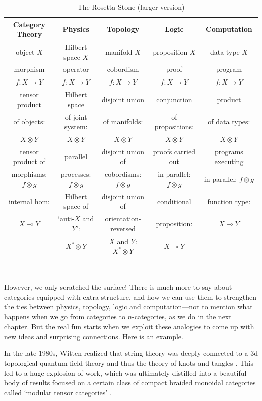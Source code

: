 \documentclass[12pt,twoside,openright]{report}
\newcommand{\maps}{\colon}
\newcommand{\lhom}{\multimap}
\newcommand{\tensor}{\otimes}
\begin{document}
\begin{table}[h]
\begin{center}
\begin{tabular}{|c|c|c|c|c|}
\hline Category Theory & Physics & Topology  & Logic & Computation 
\\
\hline object $X$       &
Hilbert space $X$  &
manifold $X$ &
proposition $X$ &
data type $X$
\\
\hline morphism &
operator &
cobordism &
proof  &
program  \\
$f\maps X \to Y$ &
$f\maps X \to Y$ &
$f \maps X \to Y$ &
$f \maps X \to Y$ &
$f \maps X \to Y$
\\
\hline tensor product  &
Hilbert space   &
disjoint union &
conjunction &
product 
\\
of objects: &
of joint system: &
of manifolds: &
of propositions: &
of data types: 
\\
$X \tensor Y$ &
$X \tensor Y$ &
$X \tensor Y$ &
$X \tensor Y$ &
$X \tensor Y$
\\
\hline tensor product of &
parallel  &
disjoint union of &
proofs carried out & 
programs executing
\\
morphisms: $f \tensor g$ & 
processes: $f \tensor g$ & 
cobordisms: $f \tensor g$ & 
in parallel: $f \tensor g$ &
in parallel: $f \tensor g$
\\
\hline internal hom:   &
Hilbert space of &
disjoint union of  &
conditional &
function type:
\\
$X \lhom Y$    &
`anti-$X$ and $Y$':  &
orientation-reversed &
proposition: &
$X \lhom Y$
\\
    &
$X^* \tensor Y$    &
$X$ and $Y$: $X^* \tensor Y$ &
$X \lhom Y$ &
\\
\hline
\end{tabular}
\\
\caption{The Rosetta Stone (larger version)}
\label{analogy_detailed}
\end{center}
\end{table}

However, we only scratched the surface!   There is much more to say about categories equipped with extra structure, and how we can use them to strengthen the ties between physics, topology, logic and computation---not to mention what happens when we go from categories to $n$-categories, as we do in the next chapter. But the real fun starts when we exploit these analogies to come up with new ideas and surprising connections.  Here is an example.

In the late 1980s, Witten \cite{Witten}
realized that string theory was deeply connected to a 3d topological quantum field theory and thus the theory of knots and tangles 
\cite{Kohno}.   This led to a huge explosion of work, which was ultimately distilled into a beautiful body of results focused on a certain class of compact braided monoidal categories called `modular tensor categories' \cite{BK,Turaev}.  
\end{document}

